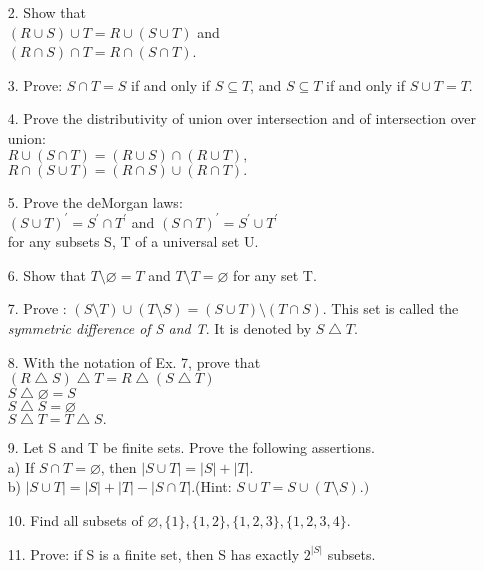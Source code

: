 \documentclass[11pt]{amsbook}
\begin{document}

\begin{enumerate}
		\item[2.]
			Show that \\
			$(R \cup S) \cup T = R \cup (S \cup T)$ and \\
			$(R \cap S) \cap T = R \cap (S \cap T)$. 

    	\item[3.]
    		Prove: $S \cap T = S$ if and only if $S \subseteq T$, and $S \subseteq T$ if and only if $S \cup T = T$.

    	\item[4.]
    		Prove the distributivity of union over intersection and of intersection over union:\\
    		$ R \cup (S \cap T) = (R \cup S) \cap (R \cup T),$\\
    		$ R \cap (S \cup T) = (R \cap S) \cup (R \cap T).$
    	
		\item[5.]
			Prove the deMorgan laws:\\
			$(S \cup T)^\mathsf{'} = S^\mathsf{'} \cap T^\mathsf{'}$ and $(S \cap T)^\mathsf{'} = S^\mathsf{'} \cup T^\mathsf{'}$\\ for any subsets S, T of a universal set U.

    	\item[6.]
    		Show that $T \setminus \varnothing = T$ and $ T 	\setminus T = \varnothing$ for any set T.

		\item[7.]
			Prove : $(S \setminus T) \cup (T \setminus S) = (S \cup T) \setminus (T \cap S).$ This set is called the \textit{symmetric difference of S and T}. It is denoted by $S \bigtriangleup T$.

		\item[8.]
			With the notation of Ex. 7, prove that\\
			$(R \bigtriangleup S) \bigtriangleup T = R \bigtriangleup (S \bigtriangleup T)$\\
			$S \bigtriangleup \varnothing = S $\\
			$S \bigtriangleup S = \varnothing$\\
			$S \bigtriangleup T = T \bigtriangleup S.$
			

		\item[9.]
			Let S and T be finite sets. Prove the following assertions.\\
			a) If $S \cap T = \varnothing$, then $ |S \cup T| = |S| + |T|$.\\
			b) $ |S \cup T| = |S| + |T| - |S \cap T|.$(Hint: $S \cup T = S \cup (T \setminus S).)$ 

		\item[10.]
			Find all subsets of $\varnothing , \{1\}, \{1, 2\}, \{1, 2, 3\}, \{1, 2, 3, 4\}$.
			
		\item[11.]
			Prove: if S is a finite set, then S has exactly $2^{|S|}$ subsets.
	
	\end{enumerate}


\end{document}
